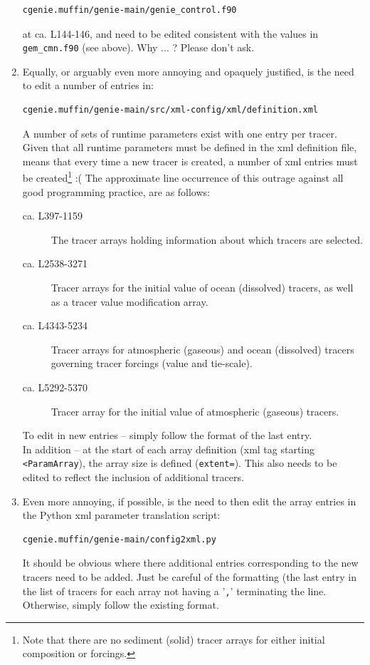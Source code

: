 \documentclass[11pt,fleqn]{book} %
\begin{document}
\begin{enumerate}
\begin{verbatim}
cgenie.muffin/genie-main/genie_control.f90
\end{verbatim}\vspace{-10pt}
at ca. L144-146, and need to be edited consistent with the values in \texttt{gem\_cmn.f90} (see above). Why ... ? Please don't ask.
\item
Equally, or arguably even more annoying and opaquely justified, is the need to edit a number of entries in:
\vspace{-10pt}\begin{verbatim}
cgenie.muffin/genie-main/src/xml-config/xml/definition.xml
\end{verbatim}\vspace{-10pt}
A number of sets of runtime parameters exist with one entry per tracer. Given that all runtime parameters must be defined in the xml definition file, means that every time a new tracer is created, a number of xml entries must be created\footnote{Note that there are no sediment (solid) tracer arrays for either initial composition or forcings.} :( The approximate line occurrence of this outrage against all good programming practice, are as follows:
\begin{description}
\item[ca. L397-1159] The tracer arrays holding information about which tracers are selected.
\item[ca. L2538-3271] Tracer arrays for the initial value of ocean (dissolved) tracers, as well as a tracer value modification array.
\item[ca. L4343-5234] Tracer arrays for atmospheric (gaseous) and ocean (dissolved) tracers governing tracer forcings (value and tie-scale).
\item[ca. L5292-5370] Tracer array for the initial value of atmospheric (gaseous) tracers.
\end{description}
To edit in new entries -- simply follow the format of the last entry.
\\In addition -- at the start of each array definition (xml tag starting \texttt{<ParamArray}), the array size is defined (\texttt{extent=}). This also needs to be edited to reflect the inclusion of additional tracers.
\item Even more annoying, if possible, is the need to then edit the array entries in the Python xml parameter translation script:
\vspace{-10pt}\begin{verbatim}
cgenie.muffin/genie-main/config2xml.py
\end{verbatim}\vspace{-10pt}
It should be obvious where there additional entries corresponding to the new tracers need to be added. Just be careful of the formatting (the last entry in the list of tracers for each array not having a '\texttt{,}' terminating the line. Otherwise, simply follow the existing format.
\end{enumerate}
\end{document}
